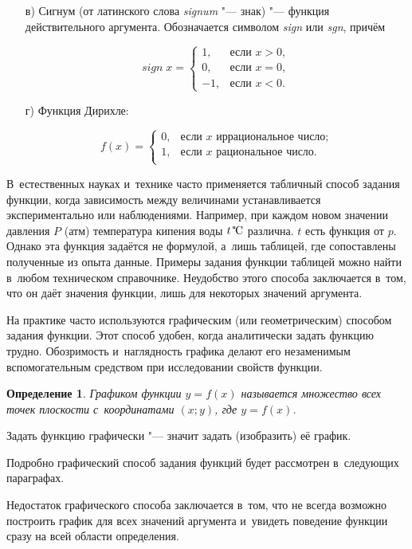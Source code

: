 \begin{itemize}
\item[в)] Сигнум (от латинского слова \textit{signum} "--- знак) "--- функция
действительного аргумента. Обозначается символом \textit{sign} или \textit{sgn},
причём 

\begin{equation*}
sign \; x = 
\begin{cases}
1,  & \text{если $x > 0$}, \\
0,  & \text{если $x = 0$}, \\
-1, &  \text{если $x < 0$}.
\end{cases}
\end{equation*}

\item[г)] Функция Дирихле:

\begin{equation*}
f(x) = 
\begin{cases}
0, & \text{если $x$ иррациональное число;} \\
1, & \text{если $x$ рациональное число.} \\
\end{cases}
\end{equation*}

\end{itemize}

В~естественных науках и~технике часто применяется табличный способ
задания функции, когда зависимость между величинами устанавливается
экспериментально или наблюдениями. Например, при каждом новом значении
давления $P$ (атм) температура кипения воды $t\, \tccentigrade$ различна.
$t$ есть функция от $p$. Однако эта функция задаётся не формулой,
а~лишь таблицей, где сопоставлены полученные из опыта данные.
Примеры задания функции таблицей можно найти в~любом техническом справочнике.
Неудобство этого способа заключается в~том, что он даёт значения функции,
лишь для некоторых значений аргумента.

На практике часто используются графическим (или геометрическим) способом
задания функции. Этот способ удобен, когда аналитически задать функцию трудно.
Обозримость и~наглядность графика делают его незаменимым
вспомогательным средством при исследовании свойств функции.

\newtheorem{Def}{Определение}
\begin{Def}
Графиком функции $y = f(x)$ называется множество всех точек плоскости
с~координатами $(x; y)$, где $y = f(x)$.
\end{Def}

Задать функцию графически "--- значит задать (изобразить) её график.

Подробно графический способ задания функций будет рассмотрен
в~следующих параграфах.

Недостаток графического способа заключается в~том, что не всегда возможно
построить график для всех значений аргумента и~увидеть поведение функции
сразу на всей области определения.


